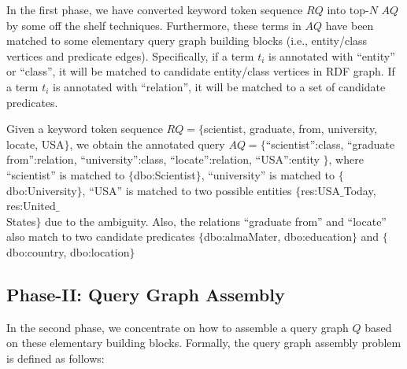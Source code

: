 In the first phase, we have converted keyword token sequence $RQ$ into top-$N$ $AQ$ by some off the shelf techniques. Furthermore, these terms in $AQ$ have been matched to some elementary query graph building blocks (i.e., entity/class vertices and predicate edges). Specifically, if a term $t_i$ is annotated with ``entity'' or ``class'', it will be matched to candidate entity/class vertices in RDF graph.
If a term $t_i$ is annotated with ``relation'', it will be matched to a set of candidate predicates.

\vspace{-0.05in}
\begin{example}\label{example:aq}
	Given a keyword token sequence $RQ = \{$scientist, graduate, from, university, locate, USA$\}$, we obtain the annotated query $AQ=\{$``scientist'':class, ``graduate from'':relation, ``university'':class, ``locate'':relation, ``USA'':entity $\}$, where ``scientist'' is matched to $\{$dbo:Scientist$\}$, ``university'' is matched to $\{$dbo:University$\}$, ``USA'' is matched to two possible entities $\{$res:USA$\_$Today, res:United$\_$\\States$\}$ due to the ambiguity. Also, the relations ``graduate from'' and ``locate'' also match to two candidate predicates $\{$dbo:almaMater, dbo:education$\}$ and $\{$dbo:country, dbo:location$\}$
\end{example}

\vspace{-0.1in}
\subsection{Phase-II: Query Graph Assembly}
In the second phase, we concentrate on how to assemble a query graph $Q$ based on these elementary building blocks. Formally, the query graph assembly problem is defined as follows:

